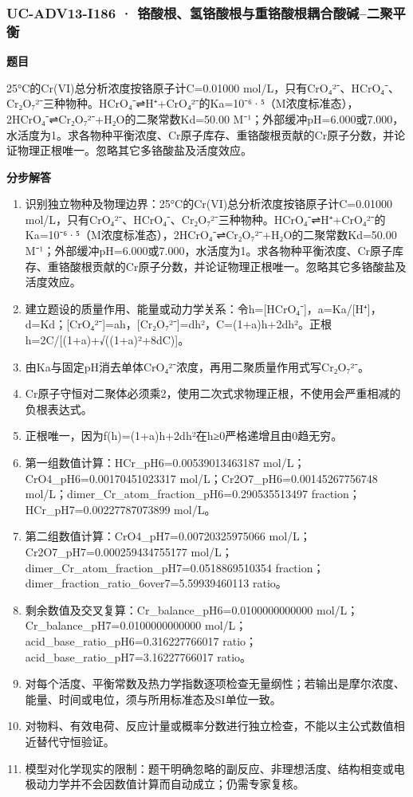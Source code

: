 \documentclass[UTF8,11pt,a4paper]{ctexart}
\begin{document}
\subsubsection*{UC-ADV13-I186 · 铬酸根、氢铬酸根与重铬酸根耦合酸碱–二聚平衡}
\noindent\textbf{题目}\par
25°C的Cr(VI)总分析浓度按铬原子计C=0.01000 mol/L，只有CrO₄²⁻、HCrO₄⁻、Cr₂O₇²⁻三种物种。HCrO₄⁻⇌H⁺+CrO₄²⁻的Ka=10⁻⁶·⁵（M浓度标准态），2HCrO₄⁻⇌Cr₂O₇²⁻+H₂O的二聚常数Kd=50.00 M⁻¹；外部缓冲pH=6.000或7.000，水活度为1。求各物种平衡浓度、Cr原子库存、重铬酸根贡献的Cr原子分数，并论证物理正根唯一。忽略其它多铬酸盐及活度效应。\par
\medskip\noindent\textbf{分步解答}
\begin{enumerate}
\item 识别独立物种及物理边界：25°C的Cr(VI)总分析浓度按铬原子计C=0.01000 mol/L，只有CrO₄²⁻、HCrO₄⁻、Cr₂O₇²⁻三种物种。HCrO₄⁻⇌H⁺+CrO₄²⁻的Ka=10⁻⁶·⁵（M浓度标准态），2HCrO₄⁻⇌Cr₂O₇²⁻+H₂O的二聚常数Kd=50.00 M⁻¹；外部缓冲pH=6.000或7.000，水活度为1。求各物种平衡浓度、Cr原子库存、重铬酸根贡献的Cr原子分数，并论证物理正根唯一。忽略其它多铬酸盐及活度效应。
\item 建立题设的质量作用、能量或动力学关系：令h=[HCrO₄⁻]，a=Ka/[H⁺]，d=Kd；[CrO₄²⁻]=ah，[Cr₂O₇²⁻]=dh²，C=(1+a)h+2dh²。正根h=2C/[(1+a)+√((1+a)²+8dC)]。
\item 由Ka与固定pH消去单体CrO₄²⁻浓度，再用二聚质量作用式写Cr₂O₇²⁻。
\item Cr原子守恒对二聚体必须乘2，使用二次式求物理正根，不使用会严重相减的负根表达式。
\item 正根唯一，因为f(h)=(1+a)h+2dh²在h≥0严格递增且由0趋无穷。
\item 第一组数值计算：HCr\_pH6=0.00539013463187 mol/L；CrO4\_pH6=0.00170451023317 mol/L；Cr2O7\_pH6=0.00145267756748 mol/L；dimer\_Cr\_atom\_fraction\_pH6=0.290535513497 fraction；HCr\_pH7=0.00227787073899 mol/L。
\item 第二组数值计算：CrO4\_pH7=0.00720325975066 mol/L；Cr2O7\_pH7=0.000259434755177 mol/L；dimer\_Cr\_atom\_fraction\_pH7=0.0518869510354 fraction；dimer\_fraction\_ratio\_6over7=5.59939460113 ratio。
\item 剩余数值及交叉复算：Cr\_balance\_pH6=0.0100000000000 mol/L；Cr\_balance\_pH7=0.0100000000000 mol/L；acid\_base\_ratio\_pH6=0.316227766017 ratio；acid\_base\_ratio\_pH7=3.16227766017 ratio。
\item 对每个活度、平衡常数及热力学指数逐项检查无量纲性；若输出是摩尔浓度、能量、时间或电位，须与所用标准态及SI单位一致。
\item 对物料、有效电荷、反应计量或概率分数进行独立检查，不能以主公式数值相近替代守恒验证。
\item 模型对化学现实的限制：题干明确忽略的副反应、非理想活度、结构相变或电极动力学并不会因数值计算而自动成立；仍需专家复核。
\end{enumerate}
\end{document}
